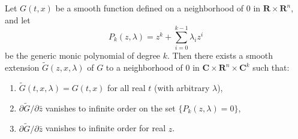 Let $G(t, x)$ be a smooth function defined on a neighborhood of $0$ in $\mathbf{R} \times \mathbf{R}^n$, and let
$$P_k(z, \lambda) = z^k + \sum_{i=0}^{k-1} \lambda_i z^i$$
be the generic monic polynomial of degree $k$. Then there exists a smooth extension $\tilde{G}(z, x, \lambda)$ of $G$ to a neighborhood of $0$ in $\mathbf{C} \times \mathbf{R}^n \times \mathbf{C}^k$ such that:
\begin{enumerate}
\item $\tilde{G}(t, x, \lambda) = G(t, x)$ for all real $t$ (with arbitrary $\lambda$),
\item $\partial \tilde{G} / \partial \bar{z}$ vanishes to infinite order on the set $\{P_k(z, \lambda) = 0\}$,
\item $\partial \tilde{G} / \partial \bar{z}$ vanishes to infinite order for real $z$.
\end{enumerate}
